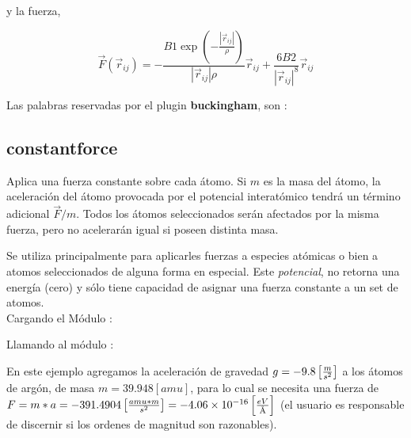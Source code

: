 y la fuerza,

$$\vec{F}(\vec{r}_{ij}) =
-\frac{B1\exp\left(-\frac{|\vec{r}_{ij}|}{\rho}\right)}{|\vec{r}_{ij}|\rho}\vec{
r}_{ij} + \frac{6B2}{|\vec{r}_{ij}|^8}\vec{r}_{ij}$$

Las palabras reservadas por el plugin \textbf{buckingham}, son :


\subsection{constantforce}
Aplica una fuerza constante sobre cada \'atomo. Si $m$ es la masa del \'atomo,
la aceleraci\'on del \'atomo provocada por el potencial interat\'omico tendr\'a
un t\'ermino adicional $\vec F/m$. Todos los \'atomos seleccionados ser\'an
afectados por la misma fuerza, pero no acelerar\'an igual si poseen distinta
masa.

Se utiliza principalmente para aplicarles fuerzas a especies at\'omicas o bien a
atomos seleccionados de alguna forma en especial. Este \textit{potencial}, no
retorna una energ\'ia (cero) y s\'olo tiene capacidad de asignar una fuerza
constante a un set de atomos.\\
                                       
Cargando el M\'odulo :

Llamando al m\'odulo :


En este ejemplo agregamos la aceleraci\'on de gravedad $g=-9.8\left[m\over
s^2\right]$ a los \'atomos de arg\'on, de masa $m=39.948 [amu]$, para lo cual se
necesita una fuerza de $F=m*a=-391.4904 \left[amu*m\over
s^2\right]=-4.06\times10^{-16}\left[eV\over \text\AA\right]$ (el usuario es
responsable de discernir si los ordenes de magnitud son razonables).\\

